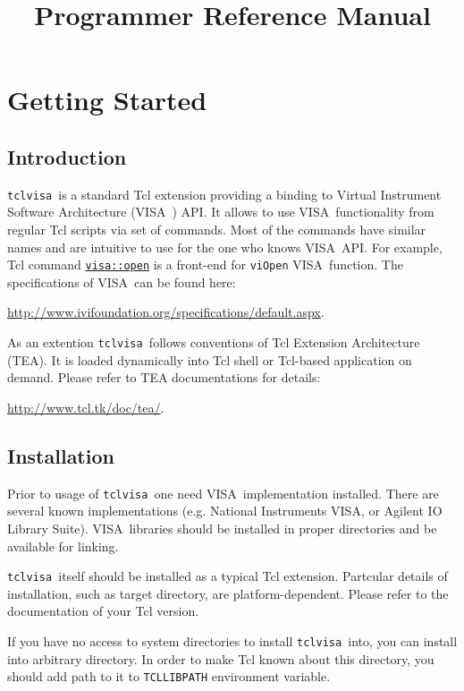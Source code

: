 \documentclass[12pt, a4paper]{book}
\title{\tclvisa Programmer Reference Manual}
\newcommand{\tclvisa}{{\tt tclvisa }}
\newcommand{\VISA}{\mbox{VISA }}
\newcommand{\COMMANDREF}[1]{{\tt \hyperref[#1]{#1}}}
\newcommand{\VISACOMMANDREF}[1]{{\tt \mbox{#1}}\index{#1}}
\begin{document}
\maketitle

\tableofcontents

\chapter{Getting Started}

\section{Introduction}

\tclvisa is a standard Tcl extension providing a binding to Virtual Instrument Software Architecture (\VISA) API. It allows to use \VISA functionality from regular Tcl scripts via set of commands. Most of the commands have similar names and are intuitive to use for the one who knows \VISA API. For example, Tcl command \COMMANDREF{visa::open} is a front-end for \VISACOMMANDREF{viOpen} \VISA function. The specifications of \VISA can be found here: 

\href{http://www.ivifoundation.org/specifications/default.aspx}{http://www.ivifoundation.org/specifications/default.aspx}.

As an extention \tclvisa follows conventions of Tcl Extension Architecture (TEA). It is loaded dynamically into Tcl shell or Tcl-based application on demand. Please refer to TEA documentations for details: 

\href{http://www.tcl.tk/doc/tea/}{http://www.tcl.tk/doc/tea/}.

\section{Installation}

Prior to usage of \tclvisa one need \VISA implementation installed. There are several known implementations (e.g. National Instruments VISA, or Agilent IO Library Suite). \VISA libraries should be installed in proper directories and be available for linking.

\tclvisa itself should be installed as a typical Tcl extension. Partcular details of installation, such as target directory, are platform-dependent. Please refer to the documentation of your Tcl version.

If you have no access to system directories to install \tclvisa into, you can install into arbitrary directory. In order to make Tcl known about this directory, you should add path to it to \mbox{\tt TCLLIBPATH} environment variable.
\end{document}
